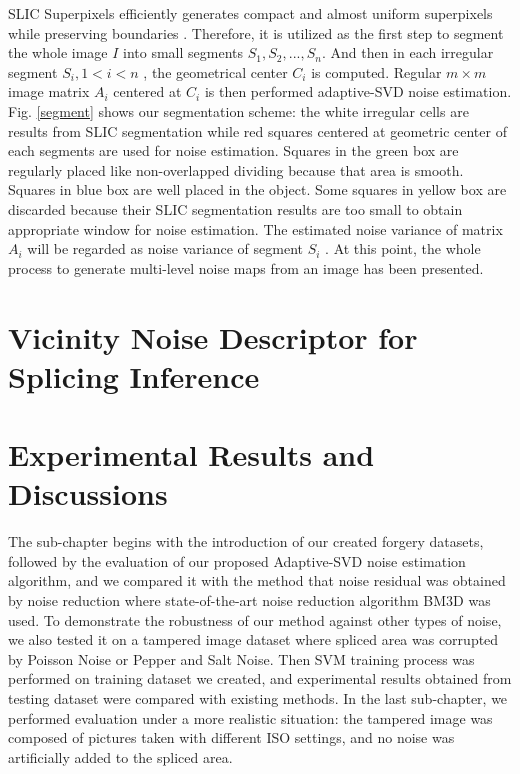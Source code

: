 \documentclass[a4paper, 12pt, twoside]{report}
\begin{document}
SLIC Superpixels efficiently generates compact and almost uniform superpixels while preserving boundaries \cite{RN80}. Therefore, it is utilized as the first step to segment the whole image $I$ into small segments ${{S}_{1}},{{S}_{2}},...,{{S}_{n}}$. And then in each irregular segment ${{S}_{i}},1<i<n$ , the geometrical center ${{C}_{i}}$ is computed. Regular $m\times m$ image matrix ${{A}_{i}}$ centered at ${{C}_{i}}$ is then performed adaptive-SVD noise estimation. Fig. \ref{segment} shows our segmentation scheme: the white irregular cells are results from SLIC segmentation while red squares centered at geometric center of each segments are used for noise estimation. Squares in the green box are regularly placed like non-overlapped dividing because that area is smooth. Squares in blue box are well placed in the object. Some squares in yellow box are discarded because their SLIC segmentation results are too small to obtain appropriate window for noise estimation. The estimated noise variance of  matrix ${{A}_{i}}$ will be regarded as noise variance of segment ${{S}_{i}}$ . At this point, the whole process to generate multi-level noise maps from an image has been presented.

\section{Vicinity Noise Descriptor for Splicing Inference}\label{s2b}
\lipsum[1]

\lipsum[2]

\section{Experimental Results and Discussions}\label{s3}
The sub-chapter begins with the introduction of our created forgery datasets, followed by the evaluation of our proposed Adaptive-SVD noise estimation algorithm, and we compared it with the method that noise residual was obtained by noise reduction where state-of-the-art noise reduction algorithm BM3D was used. To demonstrate the robustness of our method against other types of noise, we also tested it on a tampered image dataset where spliced area was corrupted by Poisson Noise or Pepper and Salt Noise. Then SVM training process was performed on training dataset we created, and experimental results obtained from testing dataset were compared with existing methods. In the last sub-chapter, we performed evaluation under a more realistic situation: the tampered image was composed of pictures taken with different ISO settings, and no noise was artificially added to the spliced area.
\end{document}
